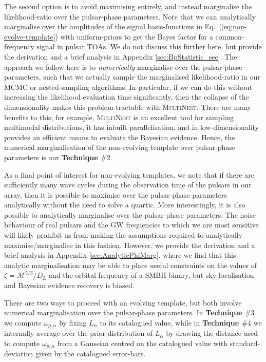 \documentclass[prd,twocolumn,showpacs,nofootinbib]{revtex4}
\begin{document}
The second option is to avoid maximising entirely, and instead marginalise the likelihood-ratio over the pulsar-phase parameters. Note that we can analytically marginalise over the amplitudes of the signal basis-functions in Eq.\ (\ref{eq:non-evolve-template}) with uniform-priors to get the Bayes factor for a common-frequency signal in pulsar TOAs. We do not discuss this further here, but provide the derivation and a brief analysis in Appendix \ref{sec:BpStatistic_sec}. The approach we follow here is to \textit{numerically} marginalise over the pulsar-phase parameters, such that we actually sample the marginalised likelihood-ratio in our MCMC or nested-sampling algorithms. In particular, if we can do this without increasing the likelihood evaluation time significantly, then the collapse of the dimensionality makes this problem tractable with \textsc{MultiNest}. There are many benefits to this; for example, \textsc{MultiNest} is an excellent tool for sampling multimodal distributions, it has inbuilt parallelisation, and in low-dimensionality provides an efficient means to evaluate the Bayesian evidence. Hence, the numerical marginalisation of the non-evolving template over pulsar-phase parameters is our {\bf Technique $\#2$}.

As a final point of interest for non-evolving templates, we note that if there are sufficiently many wave cycles during the observation time of the pulsars in our array, then it is possible to maximise over the pulsar-phase parameters analytically without the need to solve a quartic. More interestingly, it is also possible to analytically marginalise over the pulsar-phase parameters. The noise behaviour of real pulsars and the GW frequencies to which we are most sensitive will likely prohibit us from making the assumptions required to analytically maximise/marginalise in this fashion. However, we provide the derivation and a brief analysis in Appendix \ref{sec:AnalyticPhiMarg}, where we find that this analytic marginalisation may be able to place useful constraints on the values of $\zeta=\mathcal{M}^{5/3}/D_L$ and the orbital frequency of a SMBH binary, but sky-localisation and Bayesian evidence recovery is biased.

There are two ways to proceed with an evolving template, but both involve numerical marginalisation over the pulsar-phase parameters. In {\bf Technique $\#3$} we compute $\omega_{p,\alpha}$ by fixing $L_{\alpha}$ to its catalogued value, while in {\bf Technique $\#4$} we internally average over the prior distribution of $L_{\alpha}$ by drawing the distance used to compute $\omega_{p,\alpha}$ from a Gaussian centred on the catalogued value with standard-deviation given by the catalogued error-bars.
\end{document}
